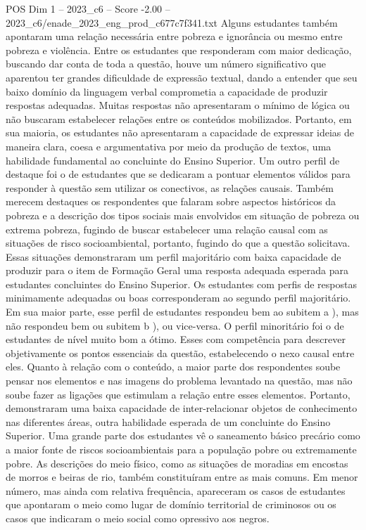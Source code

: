 \begin{textsample}{POS Dim 1 – 2023\_c6 – Score -2.00 – 2023\_c6/enade\_2023\_eng\_prod\_c677c7f341.txt}
Alguns estudantes também apontaram uma relação necessária entre pobreza e ignorância ou mesmo entre pobreza e violência.
Entre os estudantes que responderam com maior dedicação, buscando dar conta de toda a questão, houve um número significativo que aparentou ter grandes dificuldade de expressão textual, dando a entender que seu baixo domínio da linguagem verbal comprometia a capacidade de produzir respostas adequadas.
Muitas respostas não apresentaram o mínimo de lógica ou não buscaram estabelecer relações entre os conteúdos mobilizados.
Portanto, em sua maioria, os estudantes não apresentaram a capacidade de expressar ideias de maneira clara, coesa e argumentativa por meio da produção de textos, uma habilidade fundamental ao concluinte do Ensino Superior.
Um outro perfil de destaque foi o de estudantes que se dedicaram a pontuar elementos válidos para responder à questão sem utilizar os conectivos, as relações causais.
Também merecem destaques os respondentes que falaram sobre aspectos históricos da pobreza e a descrição dos tipos sociais mais envolvidos em situação de pobreza ou extrema pobreza, fugindo de buscar estabelecer uma relação causal com as situações de risco socioambiental, portanto, fugindo do que a questão solicitava.
Essas situações demonstraram um perfil majoritário com baixa capacidade de produzir para o item de Formação Geral uma resposta adequada esperada para estudantes concluintes do Ensino Superior.
Os estudantes com perfis de respostas minimamente adequadas ou boas corresponderam ao segundo perfil majoritário.
Em sua maior parte, esse perfil de estudantes respondeu bem ao subitem a ), mas não respondeu bem ou subitem b ), ou vice-versa.
O perfil minoritário foi o de estudantes de nível muito bom a ótimo.
Esses com competência para descrever objetivamente os pontos essenciais da questão, estabelecendo o nexo causal entre eles.
Quanto à relação com o conteúdo, a maior parte dos respondentes soube pensar nos elementos e nas imagens do problema levantado na questão, mas não soube fazer as ligações que estimulam a relação entre esses elementos.
Portanto, demonstraram uma baixa capacidade de inter-relacionar objetos de conhecimento nas diferentes áreas, outra habilidade esperada de um concluinte do Ensino Superior.
Uma grande parte dos estudantes vê o saneamento básico precário como a maior fonte de riscos socioambientais para a população pobre ou extremamente pobre.
As descrições do meio físico, como as situações de moradias em encostas de morros e beiras de rio, também constituíram entre as mais comuns.
Em menor número, mas ainda com relativa frequência, apareceram os casos de estudantes que apontaram o meio como lugar de domínio territorial de criminosos ou os casos que indicaram o meio social como opressivo aos negros.

\end{textsample}
